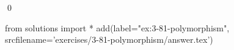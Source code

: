 
\begin{ex}
  \label{ex:3-81-polymorphism}
  
  \qed
\end{ex}
\begin{python0}
from solutions import *
add(label="ex:3-81-polymorphism",
    srcfilename='exercises/3-81-polymorphism/answer.tex')
\end{python0}
